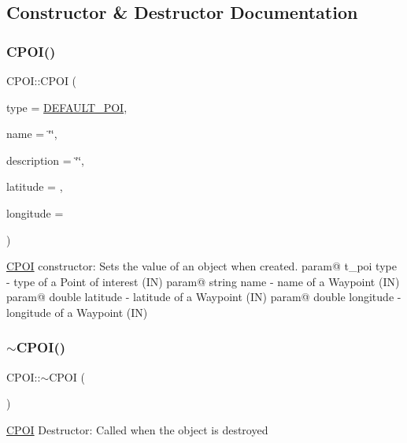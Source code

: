 \subsection{Constructor \& Destructor Documentation}
\mbox{\label{classCPOI_a9dd1c6e7b2a3e82ca3a383cc0a02bf8d}} 
\subsubsection{\texorpdfstring{C\+P\+O\+I()}{CPOI()}}
{\footnotesize\ttfamily C\+P\+O\+I\+::\+C\+P\+OI (\begin{DoxyParamCaption}\item[{\hyperlink{classCPOI_a4b95e2e14055d2f9ca134e474dd4a19f}{t\+\_\+poi}}]{type = {\ttfamily \hyperlink{classCPOI_a4b95e2e14055d2f9ca134e474dd4a19fa2c7961f7a81e01841006025f0653b0f0}{D\+E\+F\+A\+U\+L\+T\+\_\+\+P\+OI}},  }\item[{std\+::string}]{name = {\ttfamily \char`\"{}\char`\"{}},  }\item[{std\+::string}]{description = {\ttfamily \char`\"{}\char`\"{}},  }\item[{double}]{latitude = {},  }\item[{double}]{longitude = {} }\end{DoxyParamCaption})}

\hyperlink{classCPOI}{C\+P\+OI} constructor\+: Sets the value of an object when created. param@ t\+\_\+poi type -\/ type of a Point of interest (IN) param@ string name -\/ name of a Waypoint (IN) param@ double latitude -\/ latitude of a Waypoint (IN) param@ double longitude -\/ longitude of a Waypoint (IN) \mbox{\label{classCPOI_a8fc284c7b62be827e11f7e8ae443c55f}} 
\subsubsection{\texorpdfstring{$\sim$\+C\+P\+O\+I()}{~CPOI()}}
{\footnotesize\ttfamily C\+P\+O\+I\+::$\sim$\+C\+P\+OI (\begin{DoxyParamCaption}{ }\end{DoxyParamCaption})}

\hyperlink{classCPOI}{C\+P\+OI} Destructor\+: Called when the object is destroyed 

